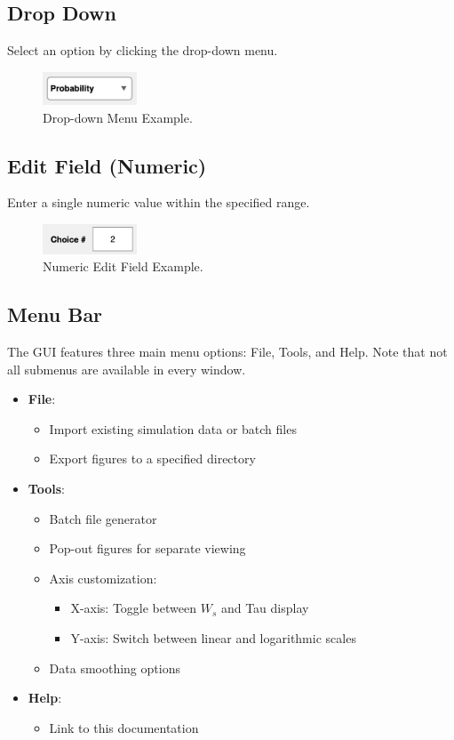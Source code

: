 \subsection{Drop Down}
Select an option by clicking the drop-down menu.
\begin{figure}[H]
    \centering
    \includegraphics[width=0.25\textwidth]{figs/dropdown_image.png}
    \caption{Drop-down Menu Example.}
    \label{fig:dropdown}
\end{figure}

\subsection{Edit Field (Numeric)}
Enter a single numeric value within the specified range.
\begin{figure}[H]
    \centering
    \includegraphics[width=0.25\textwidth]{figs/edit_field_image.png}
    \caption{Numeric Edit Field Example.}
    \label{fig:edit_field}
\end{figure}

\subsection{Menu Bar}\label{sec:menu}
The GUI features three main menu options: File, Tools, and Help. Note that not all submenus are available in every window.
\begin{itemize}
	\item \textbf{File}:
	\begin{itemize}
	\item Import existing simulation data or batch files
	\item Export figures to a specified directory
	\end{itemize}
	\item \textbf{Tools}:
	\begin{itemize}
		\item Batch file generator
		\item Pop-out figures for separate viewing
		\item Axis customization:
		\begin{itemize}
			\item X-axis: Toggle between $W_s$ and Tau display
			\item Y-axis: Switch between linear and logarithmic scales
		\end{itemize}
		\item Data smoothing options
	\end{itemize}

	\item \textbf{Help}:
	\begin{itemize}
		\item Link to this documentation
	\end{itemize}
\end{itemize}

